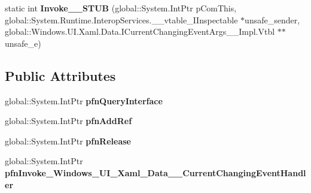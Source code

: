 \begin{DoxyCompactItemize}
\item 
\mbox{\label{struct_windows_1_1_u_i_1_1_xaml_1_1_data_1_1_current_changing_event_handler_____impl_1_1_vtbl_a908e1a64b2de3460311b698e135b938a}} 
static int {\bfseries Invoke\+\_\+\+\_\+\+S\+T\+UB} (global\+::\+System.\+Int\+Ptr p\+Com\+This, global\+::\+System.\+Runtime.\+Interop\+Services.\+\_\+\+\_\+vtable\+\_\+\+I\+Inspectable $\ast$unsafe\+\_\+sender, global\+::\+Windows.\+U\+I.\+Xaml.\+Data.\+I\+Current\+Changing\+Event\+Args\+\_\+\+\_\+\+Impl.\+Vtbl $\ast$$\ast$unsafe\+\_\+e)
\end{DoxyCompactItemize}
\subsection*{Public Attributes}
\begin{DoxyCompactItemize}
\item 
\mbox{\label{struct_windows_1_1_u_i_1_1_xaml_1_1_data_1_1_current_changing_event_handler_____impl_1_1_vtbl_a9fc198030b745fbbaf723da8b4d8ea9d}} 
global\+::\+System.\+Int\+Ptr {\bfseries pfn\+Query\+Interface}
\item 
\mbox{\label{struct_windows_1_1_u_i_1_1_xaml_1_1_data_1_1_current_changing_event_handler_____impl_1_1_vtbl_af07eb1e89f3aa3da8968288c297cde2c}} 
global\+::\+System.\+Int\+Ptr {\bfseries pfn\+Add\+Ref}
\item 
\mbox{\label{struct_windows_1_1_u_i_1_1_xaml_1_1_data_1_1_current_changing_event_handler_____impl_1_1_vtbl_a94c7041afb5c4cda66e8cc16c414ad9a}} 
global\+::\+System.\+Int\+Ptr {\bfseries pfn\+Release}
\item 
\mbox{\label{struct_windows_1_1_u_i_1_1_xaml_1_1_data_1_1_current_changing_event_handler_____impl_1_1_vtbl_ae0268099348186e207afc85a5539b30e}} 
global\+::\+System.\+Int\+Ptr {\bfseries pfn\+Invoke\+\_\+\+Windows\+\_\+\+U\+I\+\_\+\+Xaml\+\_\+\+Data\+\_\+\+\_\+\+Current\+Changing\+Event\+Handler}
\end{DoxyCompactItemize}
